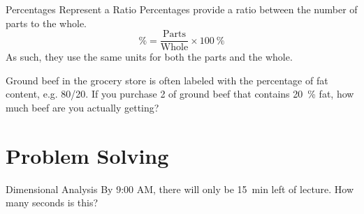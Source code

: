 \documentclass[notes=only]{beamer}
\begin{document}
\begin{frame}{Percentages Represent a Ratio}
	Percentages provide a \alert{ratio} between the number of parts to the
	whole.
	\begin{equation*}
		\unit{\percent} = \frac{\text{Parts}}{\text{Whole}} \times \qty{100}{\percent}
	\end{equation*}
	As such, they use the same units for both the parts and the whole.

	\bigskip

	\begin{example}
		Ground beef in the grocery store is often labeled with the
		percentage of fat content, e.g. 80/20. If you purchase
		\qty{2}{\pound} of ground beef that contains \qty{20}{\percent}
		fat, how much beef are you actually getting?
	\end{example}

\end{frame}

\section{Problem Solving}

\begin{frame}[t]{Dimensional Analysis}
	By 9:00 AM, there will only be \qty{15}{\minute} left of lecture. How many
	seconds is this?

\end{frame}
\end{document}
